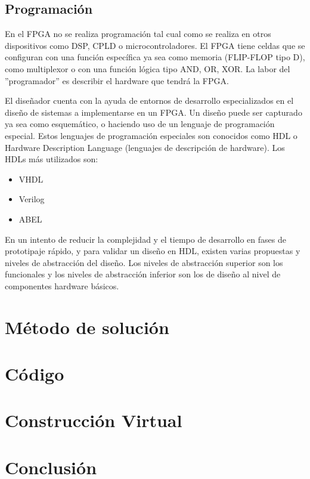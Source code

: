 \documentclass[12pt]{article}
\begin{document}
\subsection{Programación}

En el FPGA no se realiza programación tal cual como se realiza en otros dispositivos como DSP, CPLD o microcontroladores. El FPGA tiene celdas que se configuran con una función específica ya sea como memoria (FLIP-FLOP tipo D), como multiplexor o con una función lógica tipo AND, OR, XOR. La labor del ''programador'' es describir el hardware que tendrá la FPGA. 

El diseñador cuenta con la ayuda de entornos de desarrollo especializados en el diseño de sistemas a implementarse en un FPGA. Un diseño puede ser capturado ya sea como esquemático, o haciendo uso de un lenguaje de programación especial. Estos lenguajes de programación especiales son conocidos como HDL o Hardware Description Language (lenguajes de descripción de hardware). Los HDLs más utilizados son:

\begin{itemize}
  \item VHDL
  \item Verilog
  \item ABEL
\end{itemize}

En un intento de reducir la complejidad y el tiempo de desarrollo en fases de prototipaje rápido, y para validar un diseño en HDL, existen varias propuestas y niveles de abstracción del diseño. Los niveles de abstracción superior son los funcionales y los niveles de abstracción inferior son los de diseño al nivel de componentes hardware básicos.

\section{Método de solución}



\section{Código}



\section{Construcción Virtual}



\section{Conclusión}





\end{document}
